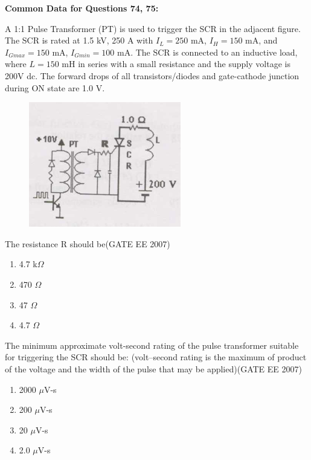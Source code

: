 \documentclass[a4paper,10pt]{exam}
\theoremstyle{remark}
\begin{document}
\begin{enumerate}
\vspace{1em}

\noindent\textbf{Common Data for Questions 74, 75:}

A 1:1 Pulse Transformer (PT) is used to trigger the SCR in the adjacent figure. The SCR is rated at 1.5 kV, 250 A with $I_L = 250$ mA, $I_H = 150$ mA, and $I_{Gmax} = 150$ mA, $I_{Gmin} = 100$ mA. The SCR is connected to an inductive load, where $L = 150$ mH in series with a small resistance and the supply voltage is 200V dc. The forward drops of all transistors/diodes and gate-cathode junction during ON state are 1.0 V.


\begin{figure}[H]
    \centering
    \includegraphics[width=0.4\linewidth]{figs/Q 74,75,76.png} \caption{}     \label{fig:myfigure}
\end{figure}

\begin{minipage}{0.6\textwidth}
\item  The resistance R should be\hfill{(GATE EE 2007)}
\begin{multicols}{4}
\begin{enumerate}
    \item  4.7 k$\Omega$ 
 \item  470 $\Omega$
 \item  47 $\Omega$ 
 \item  4.7 $\Omega$ 
\end{enumerate}
\end{multicols}

\item  The minimum approximate volt-second rating of the pulse transformer suitable for triggering the SCR should be: (volt–second rating is the maximum of product of the voltage and the width of the pulse that may be applied)\hfill{(GATE EE 2007)}
\begin{multicols}{4}
\begin{enumerate}
   \item  2000 $\mu$V-s
 \item  200 $\mu$V-s
 \item  20 $\mu$V-s 
 \item  2.0 $\mu$V-s 
\end{enumerate}
\end{multicols}
\end{minipage}
\hfill


\end{enumerate}
\end{document}
